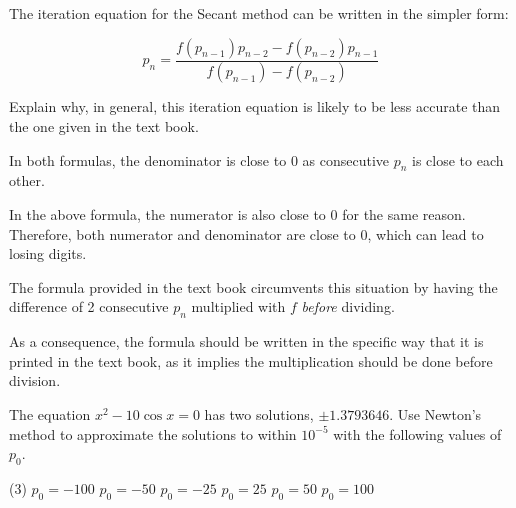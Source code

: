 \documentclass[../../../../Assignments]{subfiles}
\begin{document}
\begin{exercise}
    The iteration equation for the Secant method can be written in the simpler
    form:

    \[p_n = \frac{f(p_{n - 1}) p_{n - 2} - f(p_{n - 2}) p_{n - 1}}{f(p_{n - 1}) - f(p_{n - 2})}\]

    Explain why, in general, this iteration equation is likely to be less
    accurate than the one given in the text book.
\end{exercise}

\begin{solution}
    In both formulas, the denominator is close to \(0\) as consecutive \(p_n\)
    is close to each other.

    In the above formula, the numerator is also close to \(0\) for the same
    reason. Therefore, both numerator and denominator are close to \(0\), which
    can lead to losing digits.

    The formula provided in the text book circumvents this situation by having
    the difference of 2 consecutive \(p_n\) multiplied with \(f\) \emph{before}
    dividing.

    As a consequence, the formula should be written in the specific way that it
    is printed in the text book, as it implies the multiplication should be done
    before division.
\end{solution}

\begin{exercise}
    The equation \(x^2 - 10 \cos{x} = 0\) has two solutions, \(\pm
    \num{1.3793646}\). Use Newton's method to approximate the solutions to
    within \(10^{-5}\) with the following values of \(p_0\).

    \begin{tasks}(3)
        \task \(p_0 = -100\)
        \task \(p_0 = -50\)
        \task \(p_0 = -25\)
        \task \(p_0 = 25\)
        \task \(p_0 = 50\)
        \task \(p_0 = 100\)
    \end{tasks}
\end{exercise}
\end{document}
